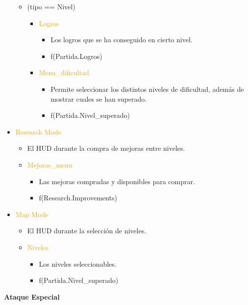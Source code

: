 \documentclass{article}
\begin{document}
\begin{itemize}
\begin{itemize}
\begin{itemize}
        \end{itemize}
    	\item (tipo == Nivel)
    	\begin{itemize}
    		\item \textcolor{Orange}{Logros}
    		\begin{itemize}
    		    \item Los logros que se ha conseguido en cierto nivel.
    		    \item f(Partida.Logros)
    		\end{itemize}
    		\item \textcolor{Orange}{Menu\_dificultad}
    		\begin{itemize}
    		    \item Permite seleccionar los distintos niveles de dificultad, además de mostrar cuales se han superado.
    			\item f(Partida.Nivel\_superado)
    		\end{itemize}
        \end{itemize}
    \end{itemize}
    \item \textcolor{Orange}{Research Mode}
    \begin{itemize}
		\item El HUD durante la compra de mejoras entre niveles.
		\item \textcolor{Orange}{Mejoras\_menu}
		\begin{itemize}
			\item Las mejoras compradas y disponibles para comprar.
			\item f(Research.Improvements)
		\end{itemize}
    \end{itemize}
	\item \textcolor{Orange}{Map Mode}
    \begin{itemize}
		\item El HUD durante la selección de niveles.
		\item \textcolor{Orange}{Niveles}
		\begin{itemize}
			\item Los niveles seleccionables.
			\item f(Partida.Nivel\_superado)
		\end{itemize}
    \end{itemize}
\end{itemize}

\clearpage

\noindent \textbf{Ataque Especial}
\end{document}
